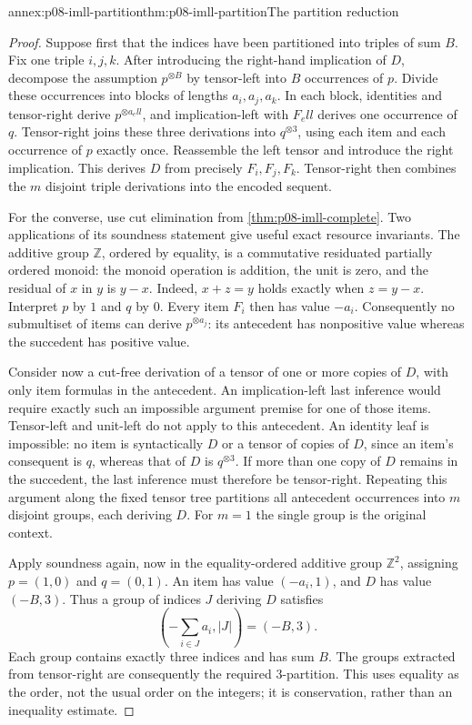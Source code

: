 \begin{annexitem}{annex:p08-imll-partition}{thm:p08-imll-partition}{The partition reduction}
\begin{proof}
Suppose first that the indices have been partitioned into triples of
sum \(B\).  Fix one triple \(i,j,k\).  After introducing the right-hand
implication of \(D\), decompose the assumption \(p^{\otimes B}\)
by tensor-left into \(B\) occurrences of \(p\).  Divide these occurrences
into blocks of lengths \(a_i,a_j,a_k\).  In each block, identities and
tensor-right derive \(p^{\otimes a_ell}\), and implication-left with
\(F_ell\) derives one occurrence of \(q\).  Tensor-right joins these
three derivations into \(q^{\otimes3}\), using each item and each
occurrence of \(p\) exactly once.  Reassemble the left tensor and
introduce the right implication.  This derives \(D\) from precisely
\(F_i,F_j,F_k\).  Tensor-right then combines the \(m\) disjoint
triple derivations into the encoded sequent.

For the converse, use cut elimination from
\cref{thm:p08-imll-complete}.  Two applications of its soundness statement
give useful exact resource invariants.  The additive group \(\mathbb Z\),
ordered by equality, is a commutative residuated partially ordered monoid:
the monoid operation is addition, the unit is zero, and the residual of
\(x\) in \(y\) is \(y-x\).  Indeed,
\(x+z=y\) holds exactly when \(z=y-x\).  Interpret \(p\) by \(1\)
and \(q\) by \(0\).  Every item \(F_i\) then has value \(-a_i\).
Consequently no submultiset of items can derive
\(p^{\otimes a_j}\): its antecedent has nonpositive value whereas
the succedent has positive value.

Consider now a cut-free derivation of a tensor of one or more copies
of \(D\), with only item formulas in the antecedent.  An implication-left
last inference would require exactly such an impossible argument premise
for one of those items.  Tensor-left and unit-left do not apply to this
antecedent.  An identity leaf is impossible: no item is syntactically
\(D\) or a tensor of copies of \(D\), since an item's consequent is
\(q\), whereas that of \(D\) is \(q^{\otimes3}\).  If more than one
copy of \(D\) remains in the succedent, the last inference must therefore
be tensor-right.  Repeating this argument along the fixed tensor tree
partitions all antecedent occurrences into \(m\) disjoint groups, each
deriving \(D\).  For \(m=1\) the single group is the original context.

Apply soundness again, now in the equality-ordered additive group
\(\mathbb Z^2\), assigning \(p=(1,0)\) and \(q=(0,1)\).
An item has value \((-a_i,1)\), and \(D\) has value \((-B,3)\).
Thus a group of indices \(J\) deriving \(D\) satisfies
\[
 \left(-\sum_{i\in J}a_i,\lvert J\rvert\right)=(-B,3).
\]
Each group contains exactly three indices and has sum \(B\).  The
groups extracted from tensor-right are consequently the required
3-partition.  This uses equality as the order, not the usual order
on the integers; it is conservation, rather than an inequality estimate.


\end{proof}
\end{annexitem}
